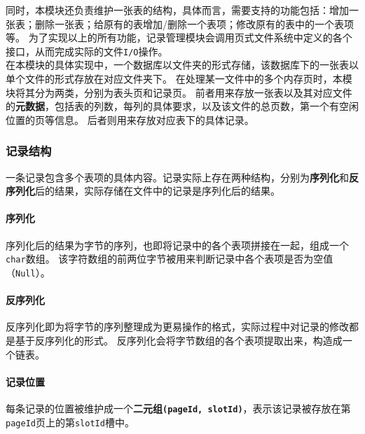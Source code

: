 \documentclass[11pt]{article}
\begin{document}
同时，本模块还负责维护一张表的结构，具体而言，需要支持的功能包括：增加一张表；删除一张表；给原有的表增加/删除一个表项；修改原有的表中的一个表项等。
为了实现以上的所有功能，记录管理模块会调用页式文件系统中定义的各个接口，从而完成实际的文件\texttt{I/O}操作。\\

在本模块的具体实现中，一个数据库以文件夹的形式存储，该数据库下的一张表以单个文件的形式存放在对应文件夹下。 
在处理某一文件中的多个内存页时，本模块将其分为两类，分别为表头页和记录页。
前者用来存放一张表以及其对应文件的\textbf{元数据}，包括表的列数，每列的具体要求，以及该文件的总页数，第一个有空闲位置的页等信息。
后者则用来存放对应表下的具体记录。

\subsubsection{记录结构}
一条记录包含多个表项的具体内容。记录实际上存在两种结构，分别为\textbf{序列化}和\textbf{反序列化}后的结果，实际存储在文件中的记录是序列化后的结果。
\paragraph{序列化} 序列化后的结果为字节的序列，也即将记录中的各个表项拼接在一起，组成一个\texttt{char}数组。
该字符数组的前两位字节被用来判断记录中各个表项是否为空值（\texttt{Null}）。
\paragraph{反序列化} 反序列化即为将字节的序列整理成为更易操作的格式，实际过程中对记录的修改都是基于反序列化的形式。
反序列化会将字节数组的各个表项提取出来，构造成一个链表。
\paragraph{记录位置}\label{recordPosition} 每条记录的位置被维护成一个\textbf{二元组\texttt{(pageId, slotId)}}，表示该记录被存放在第\texttt{pageId}页上的第\texttt{slotId}槽中。
\end{document}
